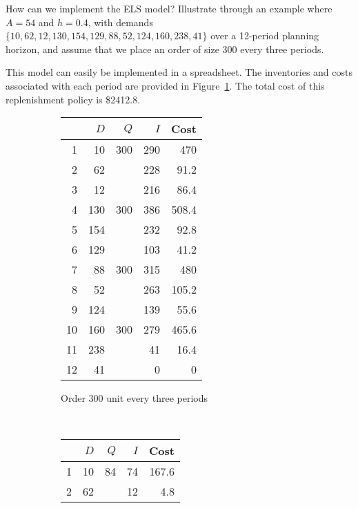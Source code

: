\begin{exercise}
How can we implement the ELS model? Illustrate through an example where $A=54$ and $h=0.4$, with demands $\{10,62,12,130,154,129,88,52,124,160,238,41\}$ over a 12-period planning horizon, and assume that we place an order of size 300 every three periods. 


\begin{solution}
This model can easily be implemented in a spreadsheet. The inventories and costs associated with each period are provided in Figure~\ref{fig:3300}. The total cost of this replenishment policy is \$2412.8.

\begin{figure}[htbp]
\begin{subfigure}[b]{0.5\textwidth}
  \centering
    \begin{tabular}{rrrrr}
    \toprule
          & $D$ & $Q$ & $I$ & Cost \\
	\midrule
    1     & 10    & 300   & 290   & 470 \\
    2     & 62    &       & 228   & 91.2 \\
    3     & 12    &       & 216   & 86.4 \\
    4     & 130   & 300   & 386   & 508.4 \\
    5     & 154   &       & 232   & 92.8 \\
    6     & 129   &       & 103   & 41.2 \\
    7     & 88    & 300   & 315   & 480 \\
    8     & 52    &       & 263   & 105.2 \\
    9     & 124   &       & 139   & 55.6 \\
    10    & 160   & 300   & 279   & 465.6 \\
    11    & 238   &       & 41    & 16.4 \\
    12    & 41    &       & 0     & 0 \\
    \bottomrule
    \end{tabular}%
\caption{Order 300 unit every three periods}
\label{fig:3300}
\end{subfigure}
~
\begin{subfigure}[b]{0.5\textwidth}
  \centering
    \begin{tabular}{rrrrr}
    \toprule
          & $D$ & $Q$ & $I$ & Cost \\
	\midrule
    1     & 10    & 84    & 74    & 167.6 \\
    2     & 62    &       & 12    & 4.8 \\

\end{tabular}
\end{subfigure}
\end{figure}
\end{solution}
\end{exercise}

